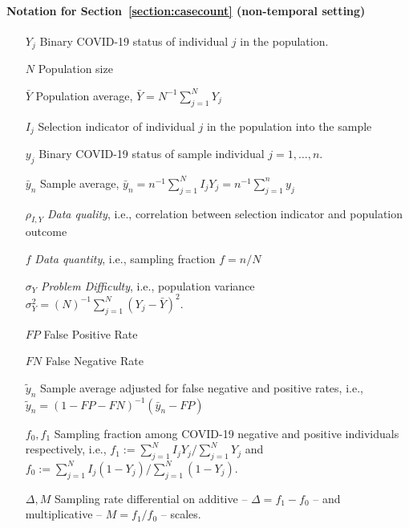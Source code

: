 \documentclass[11pt]{amsart}
\numberwithin{equation}{section}
\theoremstyle{plain}
\begin{document}
\paragraph{Notation for Section~\ref{section:casecount} (non-temporal setting)}
\begin{itemize}
\item[$Y_j$] \quad Binary COVID-19 status of individual $j$ in the population.
\item[$N$] \quad Population size
\item[$\bar Y$] \quad Population average, $\bar Y = N^{-1} \sum_{j=1}^N Y_j$
\item[$I_j$] \quad Selection indicator of individual $j$ in the population into the sample
\item[$y_j$] \quad Binary COVID-19 status of sample individual $j=1,\ldots,n$.
\item[$\bar y_n$] \quad Sample average, $\bar y_n = n^{-1} \sum_{j=1}^N I_j Y_j = n^{-1} \sum_{j=1}^n y_j$
\item[$\rho_{I,Y}$] \quad \emph{Data quality}, i.e., correlation between selection indicator and population outcome
\item[$f$] \quad \emph{Data quantity}, i.e., sampling fraction $f = n/N$
\item[$\sigma_Y$] \quad \emph{Problem Difficulty}, i.e., population variance $\sigma_Y^2 = (N)^{-1} \sum_{j=1}^N (Y_j - \bar Y)^2$.
\item[$FP$] \quad False Positive Rate
\item[$FN$] \quad False Negative Rate
\item[$\tilde y_n$] \quad Sample average adjusted for false negative and positive rates, i.e., $\tilde y_n = (1-FP-FN)^{-1} (\bar y_n - FP)$
\item[$f_0, f_1$] \quad Sampling fraction among COVID-19 negative and positive individuals respectively, i.e., $f_1 := \sum_{j=1}^N I_j Y_j / \sum_{j=1}^N Y_j$
and $f_0 := \sum_{j=1}^N I_j (1-Y_j) / \sum_{j=1}^N (1-Y_j)$.
\item[$\Delta, M$] \quad Sampling rate differential on additive -- $\Delta = f_1 - f_0$ -- and multiplicative -- $M = f_1/f_0$ -- scales.
\end{itemize}
\end{document}
